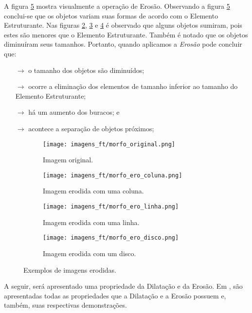 A figura \ref{fig:erosao} mostra visualmente a operação de Erosão. Observando a figura \ref{fig:erosao} conclui-se que os objetos variam suas formas de acordo com o Elemento Estruturante. Nas figuras \ref{fig:ero_coluna}, \ref{fig:ero_linha} e \ref{fig:ero_disco} é observado que alguns objetos sumiram, pois estes são menores que o Elemento Estruturante. Também é notado que os objetos diminuíram seus tamanhos. Portanto, quando aplicamos a \textit{Erosão} pode concluir que:

\begin{itemize}
	\item[$\rightarrow$] o tamanho dos objetos são diminuídos; 
	\item[$\rightarrow$] ocorre a eliminação dos elementos de tamanho inferior ao tamanho do Elemento Estruturante;
	\item[$\rightarrow$] há um aumento dos buracos; e
	\item[$\rightarrow$] acontece a separação de objetos próximos;
\end{itemize}

\begin{figure}[h]
	\centering
	\begin{subfigure}[b]{0.4\textwidth}
		\centering
		\texttt{[image: imagens\_ft/morfo\_original.png]}
		\caption{Imagem original.}
		\label{fig:original2}
	\end{subfigure}
	\hfill
	\begin{subfigure}[b]{0.4\textwidth}
		\centering
		\texttt{[image: imagens\_ft/morfo\_ero\_coluna.png]}
		\caption{Imagem erodida com uma coluna.}
		\label{fig:ero_coluna}
	\end{subfigure}
	\hfill
	\begin{subfigure}[b]{0.4\textwidth}
		\centering
		\texttt{[image: imagens\_ft/morfo\_ero\_linha.png]}
		\caption{Imagem erodida com uma linha.}
		\label{fig:ero_linha}
	\end{subfigure}
	\hfill
	\begin{subfigure}[b]{0.4\textwidth}
		\centering
		\texttt{[image: imagens\_ft/morfo\_ero\_disco.png]}
		\caption{Imagem erodida com um disco.}
		\label{fig:ero_disco}
	\end{subfigure}
	\caption{Exemplos de imagens erodidas.}
	\label{fig:erosao}
\end{figure}

A seguir, será apresentado uma propriedade da Dilatação e da Erosão. Em \cite{haralick1987image}, são apresentadas todas as propriedades que a Dilatação e a Erosão possuem e, também, suas respectivas demonstrações.

